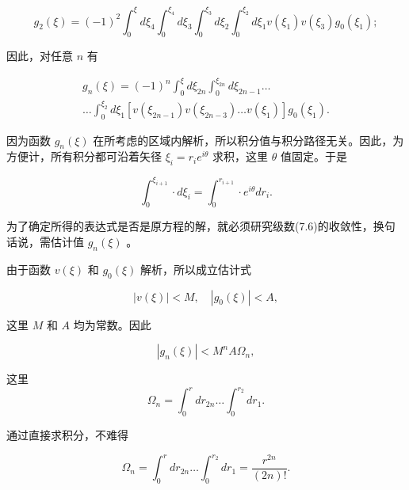 \begin{equation*}
g _ {2} (\xi) = (- 1) ^ {2} \int_ {0} ^ {\xi} d \xi_ {4} \int_ {0} ^ {\xi_ {4}} d \xi_ {3} \int_ {0} ^ {\xi_ {3}} d \xi_ {2} \int_ {0} ^ {\xi_ {2}} d \xi_ {1} v (\xi_ {1}) v (\xi_ {3}) g _ {0} (\xi_ {1});
\end{equation*}

因此，对任意 $n$ 有

\begin{equation*}
\begin{array}{l} g _ {n} (\xi) = (- 1) ^ {n} \int_ {0} ^ {\xi} d \xi_ {2 n} \int_ {0} ^ {\xi_ {2 n}} d \xi_ {2 n - 1} \dots \\ \dots \int_ {0} ^ {\xi_ {2}} d \xi_ {1} [ v (\xi_ {2 n - 1}) v (\xi_ {2 n - 3}) \dots v (\xi_ {1}) ] g _ {0} (\xi_ {1}). \end{array}
\end{equation*}

因为函数 $g_{n}(\xi)$ 在所考虑的区域内解析，所以积分值与积分路径无关。因此，为方便计，所有积分都可沿着矢径 $\xi_{i}=r_{i}e^{i\theta}$ 求积，这里 $\theta$ 值固定。于是

\begin{equation*}
\int_ {0} ^ {\xi_ {i + 1}} \cdot d \xi_ {i} = \int_ {0} ^ {r _ {i + 1}} \cdot e ^ {i \theta} d r _ {i}.
\end{equation*}

为了确定所得的表达式是否是原方程的解，就必须研究级数(7.6)的收敛性，换句话说，需估计值 $g_{n}(\xi)$ 。

由于函数 $v(\xi)$ 和 $g_{0}(\xi)$ 解析，所以成立估计式

\begin{equation*}
\left| v (\xi) \right| <   M, \quad \left| g _ {0} (\xi) \right| <   A,
\end{equation*}

这里 $M$ 和 $A$ 均为常数。因此

\begin{equation*}
\left| g _ {n} (\xi) \right| <   M ^ {n} A \Omega_ {n},
\end{equation*}

这里
\begin{equation*}
\Omega_ {n} = \int_ {0} ^ {r} d r _ {2 n} \dots \int_ {0} ^ {r _ {2}} d r _ {1}.
\end{equation*}

通过直接求积分，不难得

\begin{equation*}
\Omega_ {n} = \int_ {0} ^ {r} d r _ {2 n} \dots \int_ {0} ^ {r _ {2}} d r _ {1} = \frac {r ^ {2 n}}{(2 n) !}.\tag{7.8}
\end{equation*}

